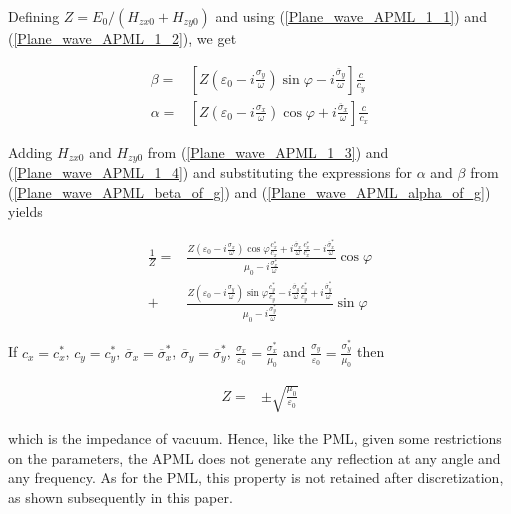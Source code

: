 Defining $Z=E_{0}/\left( H_{zx0}+H_{zy0}\right)$ and using (\ref{Plane_wave_APML_1_1})
and (\ref{Plane_wave_APML_1_2}), we get

\begin{eqnarray}
\beta  = & \left[ Z\left( \varepsilon _{0}-i\frac{\sigma _{y}}{\omega }\right) \sin \varphi -i\frac{\overline{\sigma }_{y}}{\omega }\right] \frac{c}{c_{y}}\label{Plane_wave_APML_beta_of_g} \\
\alpha  = & \left[ Z\left( \varepsilon _{0}-i\frac{\sigma _{x}}{\omega }\right) \cos \varphi +i\frac{\overline{\sigma }_{x}}{\omega }\right] \frac{c}{c_{x}}\label{Plane_wave_APML_alpha_of_g}
\end{eqnarray}


Adding $H_{zx0}$ and $H_{zy0}$ from (\ref{Plane_wave_APML_1_3})
and (\ref{Plane_wave_APML_1_4}) and substituting the expressions
for $\alpha$ and $\beta$ from (\ref{Plane_wave_APML_beta_of_g})
and (\ref{Plane_wave_APML_alpha_of_g}) yields

\begin{eqnarray}
\frac{1}{Z} = & \frac{Z\left( \varepsilon _{0}-i\frac{\sigma _{x}}{\omega }\right) \cos \varphi \frac{c^{*}_{x}}{c_{x}}+i\frac{\overline{\sigma }_{x}}{\omega }\frac{c^{*}_{x}}{c_{x}}-i\frac{\overline{\sigma }^{*}_{x}}{\omega }}{\mu _{0}-i\frac{\sigma ^{*}_{x}}{\omega }}\cos \varphi \nonumber \\
 + & \frac{Z\left( \varepsilon _{0}-i\frac{\sigma _{y}}{\omega }\right) \sin \varphi \frac{c^{*}_{y}}{c_{y}}-i\frac{\overline{\sigma }_{y}}{\omega }\frac{c^{*}_{y}}{c_{y}}+i\frac{\overline{\sigma }^{*}_{y}}{\omega }}{\mu _{0}-i\frac{\sigma ^{*}_{y}}{\omega }}\sin \varphi
\end{eqnarray}


If $c_{x}=c^{*}_{x}$, $c_{y}=c^{*}_{y}$, $\overline{\sigma }_{x}=\overline{\sigma }^{*}_{x}$, $\overline{\sigma }_{y}=\overline{\sigma }^{*}_{y}$, $\frac{\sigma _{x}}{\varepsilon _{0}}=\frac{\sigma ^{*}_{x}}{\mu _{0}}$ and $\frac{\sigma _{y}}{\varepsilon _{0}}=\frac{\sigma ^{*}_{y}}{\mu _{0}}$ then

\begin{eqnarray}
Z = & \pm \sqrt{\frac{\mu _{0}}{\varepsilon _{0}}}\label{APML_impedance}
\end{eqnarray}


which is the impedance of vacuum. Hence, like the PML, given some
restrictions on the parameters, the APML does not generate any reflection
at any angle and any frequency. As for the PML, this property is not
retained after discretization, as shown subsequently in this paper.

